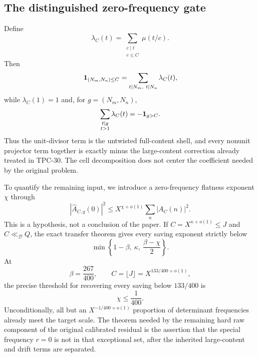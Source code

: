 \subsection{The distinguished zero-frequency gate}

Define
\begin{equation}
 \lambda_C(t)=\sum_{\substack{c\mid t\\c\le C}}\mu(t/c).
 \label{eq:tpc32-intro-projector}
\end{equation}
Then
\begin{equation}
 \mathbf 1_{(N_m,N_n)\le C}
 =\sum_{t\mid N_m,\ t\mid N_n}\lambda_C(t),
 \label{eq:tpc32-intro-projector-identity}
\end{equation}
while $\lambda_C(1)=1$ and, for $g=(N_m,N_n)$,
\begin{equation}
 \sum_{\substack{t\mid g\\t>1}}\lambda_C(t)
 =-\mathbf 1_{g>C}.
 \label{eq:tpc32-intro-projector-reassembly}
\end{equation}
Thus the unit-divisor term is the untwisted full-content shell, and every
nonunit projector term together is exactly minus the large-content
correction already treated in TPC-30.  The cell decomposition does not
center the coefficient needed by the original problem.

To quantify the remaining input, we introduce a zero-frequency flatness
exponent $\chi$ through
\begin{equation}
 |\widehat A_{C,q}(0)|^2
 \le X^{\chi+o(1)}\sum_n|A_C(n)|^2.
 \label{eq:tpc32-intro-flatness}
\end{equation}
This is a hypothesis, not a conclusion of the paper.  If
$C=X^{\kappa+o(1)}\le J$ and $C\ll_{\mathscr D}Q$, the exact transfer theorem
gives every saving exponent strictly below
\begin{equation}
 \min\left\{1-\beta,\ \kappa,\ \frac{\beta-\chi}{2}\right\}.
 \label{eq:tpc32-intro-transfer-margin}
\end{equation}
At
\begin{equation}
 \beta=\frac{267}{400},
 \qquad
 C=\lfloor J\rfloor=X^{133/400+o(1)},
 \label{eq:tpc32-intro-high-beta}
\end{equation}
the precise threshold for recovering every saving below $133/400$ is
\begin{equation}
 \boxed{\chi\le\frac1{400}.}
 \label{eq:tpc32-intro-one-over-four-hundred}
\end{equation}
Unconditionally, all but an $X^{-1/400+o(1)}$ proportion of determinant
frequencies already meet the target scale.  The theorem needed by the
remaining hard raw component of the original calibrated residual is the
assertion that the special frequency $r=0$ is not in that exceptional set,
after the inherited large-content and drift terms are separated.

